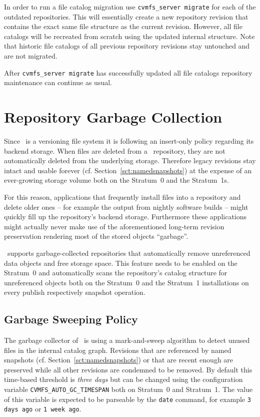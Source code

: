 In order to run a file catalog migration use \texttt{cvmfs\_server migrate} for each of the outdated repositories.
This will essentially create a new repository revision that contains the exact same  file structure as the current revision.
However, all file catalogs will be recreated from scratch using the updated internal structure.
Note that historic file catalogs of all previous repository revisions stay untouched and are not migrated.

After \texttt{cvmfs\_server migrate} has successfully updated all file catalogs repository maintenance can continue as usual.



\section{Repository Garbage Collection}
\label{sct:garbagecollection}
Since \cvmfs\ is a versioning file system it is following an insert-only policy regarding its backend storage.
When files are deleted from a \cvmfs\ repository, they are not automatically deleted from the underlying storage.
Therefore legacy revisions stay intact and usable forever (cf. Section~\ref{sct:namedsnapshots}) at the expense of an ever-growing storage volume both on the Stratum~0 and the Stratum~1s.

For this reason, applications that frequently install files into a repository and delete older ones -- for example the output from nightly software builds -- might quickly fill up the repository's backend storage.
Furthermore these applications might actually never make use of the aforementioned long-term revision preservation rendering most of the stored objects ``garbage''.

\cvmfs\ supports garbage-collected repositories that automatically remove unreferenced data objects and free storage space.
This feature needs to be enabled on the Stratum~0 and automatically scans the repository's catalog structure for unreferenced objects both on the Stratum~0 and the Stratum~1 installations on every publish respectively snapshot operation.

\subsection{Garbage Sweeping Policy}
The garbage collector of \cvmfs\ is using a mark-and-sweep algorithm to detect unused files in the internal catalog graph.
%
Revisions that are referenced by named snapshots (cf. Section~\ref{sct:namedsnapshots}) or that are recent enough are preserved while all other revisions are condemned to be removed.
By default this time-based threshold is \emph{three days} but can be changed using the configuration variable \texttt{CVMFS\_AUTO\_GC\_TIMESPAN} both on Stratum~0 and Stratum~1.
The value of this variable is expected to be parseable by the \texttt{date} command, for example \texttt{3 days ago} or \texttt{1 week ago}.

